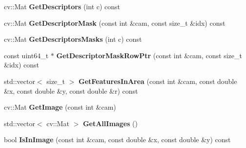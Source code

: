 \begin{DoxyCompactItemize}
\item 
cv\+::\+Mat {\bfseries Get\+Descriptors} (int c) const \hypertarget{classMultiColSLAM_1_1cMultiKeyFrame_ae01aef70cf0c582b6311b06fa82f3707}{}\label{classMultiColSLAM_1_1cMultiKeyFrame_ae01aef70cf0c582b6311b06fa82f3707}

\item 
cv\+::\+Mat {\bfseries Get\+Descriptor\+Mask} (const int \&cam, const size\+\_\+t \&idx) const \hypertarget{classMultiColSLAM_1_1cMultiKeyFrame_a0c3c067e7c7604bd74a2a69a1e96494e}{}\label{classMultiColSLAM_1_1cMultiKeyFrame_a0c3c067e7c7604bd74a2a69a1e96494e}

\item 
cv\+::\+Mat {\bfseries Get\+Descriptors\+Masks} (int c) const \hypertarget{classMultiColSLAM_1_1cMultiKeyFrame_a3f8343792a42e1ccae6a14c7830ded90}{}\label{classMultiColSLAM_1_1cMultiKeyFrame_a3f8343792a42e1ccae6a14c7830ded90}

\item 
const uint64\+\_\+t $\ast$ {\bfseries Get\+Descriptor\+Mask\+Row\+Ptr} (const int \&cam, const size\+\_\+t \&idx) const \hypertarget{classMultiColSLAM_1_1cMultiKeyFrame_a83a6f8b3180002075a8031fa62bc70a6}{}\label{classMultiColSLAM_1_1cMultiKeyFrame_a83a6f8b3180002075a8031fa62bc70a6}

\item 
std\+::vector$<$ size\+\_\+t $>$ {\bfseries Get\+Features\+In\+Area} (const int \&cam, const double \&x, const double \&y, const double \&r) const \hypertarget{classMultiColSLAM_1_1cMultiKeyFrame_a4e89cd4a1150614138e1ae3ccdd93fab}{}\label{classMultiColSLAM_1_1cMultiKeyFrame_a4e89cd4a1150614138e1ae3ccdd93fab}

\item 
cv\+::\+Mat {\bfseries Get\+Image} (const int \&cam)\hypertarget{classMultiColSLAM_1_1cMultiKeyFrame_a729bbcd132e5bd8019731f58bf82f288}{}\label{classMultiColSLAM_1_1cMultiKeyFrame_a729bbcd132e5bd8019731f58bf82f288}

\item 
std\+::vector$<$ cv\+::\+Mat $>$ {\bfseries Get\+All\+Images} ()\hypertarget{classMultiColSLAM_1_1cMultiKeyFrame_a67b03e9c613009ebaeb3f14ade6a9570}{}\label{classMultiColSLAM_1_1cMultiKeyFrame_a67b03e9c613009ebaeb3f14ade6a9570}

\item 
bool {\bfseries Is\+In\+Image} (const int \&cam, const double \&x, const double \&y) const \hypertarget{classMultiColSLAM_1_1cMultiKeyFrame_a4cfd0e5fe31d7b187e836ff3b8b3443f}{}\label{classMultiColSLAM_1_1cMultiKeyFrame_a4cfd0e5fe31d7b187e836ff3b8b3443f}


\end{DoxyCompactItemize}
